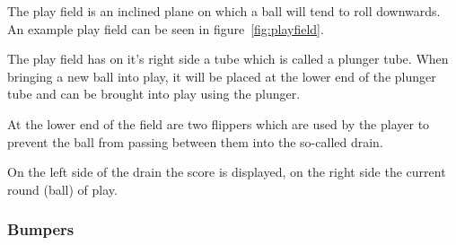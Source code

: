 \documentclass[fontsize=12pt,
               paper=a4,
               twoside=false,
               parskip=half,
               ]{scrartcl}
\begin{document}
The play field is an inclined plane on which a ball will tend to roll downwards. An example play field can be seen in figure~\ref{fig:playfield}.

The play field has on it's right side a tube which is called a plunger tube. When bringing a new ball into play, it will be placed at the lower end of the plunger tube and can be brought into play using the plunger.

At the lower end of the field are two flippers which are used by the player to prevent the ball from passing between them into the so-called drain.

On the left side of the drain the score is displayed, on the right side the current round (ball) of play.

\subsubsection{Bumpers}
\end{document}
